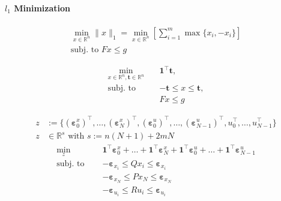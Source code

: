 \paragraph[l1 Minimization]{$l_{1}$ Minimization}
\noindent
\begin{gather*}
    \min_{x \in \mathbb{R}^n} \|x\|_1 = \min_{x \in \mathbb{R}^n} \left[ \sum_{i=1}^{m} \max \{x_i, -x_i\} \right] \\
    \text{subj.\ to } Fx \leq g
\end{gather*}

\noindent
\begin{align*}
    \min_{x \in \mathbb{R}^n, \mathbf{t} \in \mathbb{R}^n}\quad & \mathbf{1}^\top \mathbf{t},         \\
    \text{subj.\ to }\quad                                      & -\mathbf{t} \leq x \leq \mathbf{t}, \\
                                                                & Fx \leq g
\end{align*}

\noindent
\begin{align*}
    z & := \{ {(\bm{\varepsilon}_{0}^x)}^\top, \dots, {(\bm{\varepsilon}_{N}^x)}^\top, {(\bm{\varepsilon}_{0}^u)}^\top, \dots, {(\bm{\varepsilon}_{N-1}^u)}^\top, u_0^\top, \dots, u_{N-1}^\top \} \\
    z & \in \mathbb{R}^s \text{ with } s := n(N+1) + 2mN
\end{align*}
\begin{align*}
    \min_z \quad            & \mathbf{1}^\top \bm{\varepsilon}_{0}^x + \dots + \mathbf{1}^\top \bm{\varepsilon}_{N}^x + \mathbf{1}^\top \bm{\varepsilon}_{0}^u + \dots + \mathbf{1}^\top \bm{\varepsilon}_{N-1}^u \\
    \text{subj.\ to } \quad & -\bm{\varepsilon}_{x_i} \leq Q x_i \leq\bm{\varepsilon}_{x_i}                                                                                                                       \\
                            & -\bm{\varepsilon}_{x_N} \leq P x_N \leq\bm{\varepsilon}_{x_N}                                                                                                                       \\
                            & -\bm{\varepsilon}_{u_i} \leq R u_i \leq\bm{\varepsilon}_{u_i}\end{align*}

